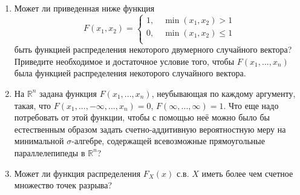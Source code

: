 \begin{problem}
 \begin{enumerate}
 
 \item Может ли приведенная ниже функция
\[
F\left( {x_1 ,x_2 } \right)=\left\{ {\begin{array}{l}
 1,\quad \min \left( {x_1 ,x_2 } \right)>1 \\ 
 0,\quad \min \left( {x_1 ,x_2 } \right)\le 1 \\ 
 \end{array}} \right.
\]
быть функцией распределения некоторого двумерного случайного вектора? 
Приведите необходимое и достаточное условие того, чтобы $F\left( {x_1 
,...,x_n } \right)$ была функцией распределения некоторого случайного 
вектора.

\item На ${\mathbb R}^n$ задана функция $F\left( {x_1 ,...,x_n } \right)$, 
неубывающая по каждому аргументу, такая, что $F\left( {x_1 ,...,-\infty 
,...,x_n } \right)=0$, $F\left( {\infty ,...,\infty } \right)=1$. Что еще 
надо потребовать от этой функции, чтобы с помощью неё можно было бы 
естественным образом задать счетно-аддитивную вероятностную меру на 
минимальной $\sigma $-алгебре, содержащей всевозможные прямоугольные 
параллелепипеды в ${\mathbb R}^n$?

\item Может ли функция распределения $F_X \left( x \right)$ с.в. $X$ 
иметь более чем счетное множество точек разрыва?

\end{enumerate}
\end{problem}


